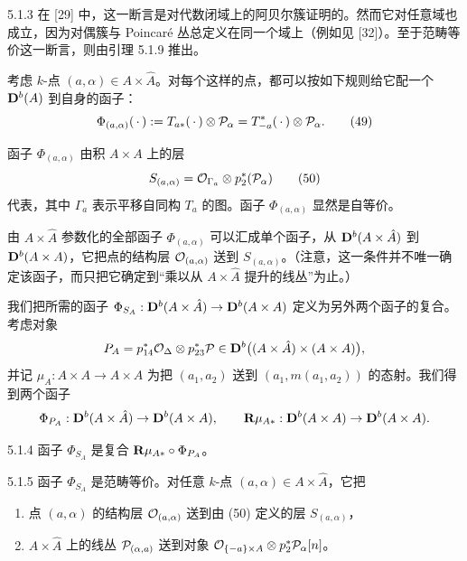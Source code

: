 \begin{remark}{5.1.3}
在 [29] 中，这一断言是对代数闭域上的阿贝尔簇证明的。然而它对任意域也成立，因为对偶簇与 Poincaré 丛总定义在同一个域上（例如见 [32]）。至于范畴等价这一断言，则由引理 5.1.9 推出。
\end{remark}

考虑 $k$-点 $(a,\alpha)\in A\times\hat A$。对每个这样的点，都可以按如下规则给它配一个 $\mathbf{D}^{b}(A)$ 到自身的函子：
\begin{equation}
\Phi_{(a,\alpha)}(\,\cdot\,):=T_{a*}(\,\cdot\,)\otimes\mathcal{P}_\alpha=T^*_{-a}(\,\cdot\,)\otimes\mathcal{P}_\alpha. \tag{49}
\end{equation}

函子 $\Phi_{(a,\alpha)}$ 由积 $A\times A$ 上的层
\begin{equation}
S_{(a,\alpha)}=\mathcal{O}_{\Gamma_a}\otimes p^*_2(\mathcal{P}_\alpha) \tag{50}
\end{equation}
代表，其中 $\Gamma_a$ 表示平移自同构 $T_a$ 的图。函子 $\Phi_{(a,\alpha)}$ 显然是自等价。

由 $A\times\hat A$ 参数化的全部函子 $\Phi_{(a,\alpha)}$ 可以汇成单个函子，从 $\mathbf{D}^{b}(A\times\hat A)$ 到 $\mathbf{D}^{b}(A\times A)$，它把点的结构层 $\mathcal{O}_{(a,\alpha)}$ 送到 $S_{(a,\alpha)}$。（注意，这一条件并不唯一确定该函子，而只把它确定到“乘以从 $A\times\hat A$ 提升的线丛”为止。）

我们把所需的函子 $\Phi_{S_A}:\mathbf{D}^{b}(A\times\hat A)\to\mathbf{D}^{b}(A\times A)$ 定义为另外两个函子的复合。考虑对象
\begin{equation*}
P_A=p^*_{14}\mathcal{O}_\Delta\otimes p^*_{23}\mathcal{P}\in\mathbf{D}^{b}\bigl((A\times\hat A)\times(A\times A)\bigr),
\end{equation*}
并记 $\mu_A:A\times A\to A\times A$ 为把 $(a_1,a_2)$ 送到 $(a_1,m(a_1,a_2))$ 的态射。我们得到两个函子
\begin{equation*}
\Phi_{P_A}:\mathbf{D}^{b}(A\times\hat A)\to\mathbf{D}^{b}(A\times A),\qquad
\mathbf{R}\mu_{A*}:\mathbf{D}^{b}(A\times A)\to\mathbf{D}^{b}(A\times A).
\end{equation*}

\begin{definition}{5.1.4}
函子 $\Phi_{S_A}$ 是复合 $\mathbf{R}\mu_{A*}\circ\Phi_{P_A}$。
\end{definition}

\begin{proposition}{5.1.5}
函子 $\Phi_{S_A}$ 是范畴等价。对任意 $k$-点 $(a,\alpha)\in A\times\hat A$，它把
\begin{enumerate}[label=\alph*),leftmargin=2.8em,itemsep=1pt,topsep=2pt]
\item 点 $(a,\alpha)$ 的结构层 $\mathcal{O}_{(a,\alpha)}$ 送到由 (50) 定义的层 $S_{(a,\alpha)}$，
\item $A\times\hat A$ 上的线丛 $\mathcal{P}_{(\alpha,a)}$ 送到对象 $\mathcal{O}_{\{-a\}\times A}\otimes p^*_2\mathcal{P}_\alpha[n]$。
\end{enumerate}
\end{proposition}

